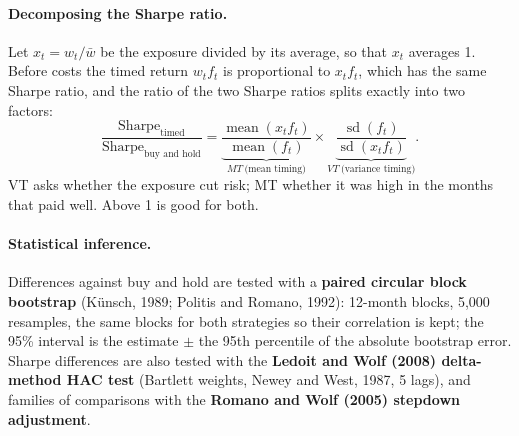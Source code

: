 \documentclass[12pt]{article}
\begin{document}
\paragraph{Decomposing the Sharpe ratio.} Let $x_t=w_t/\bar w$ be the exposure divided by its average, so that $x_t$ averages 1. Before costs the timed return $w_tf_t$ is proportional to $x_tf_t$, which has the same Sharpe ratio, and the ratio of the two Sharpe ratios splits exactly into two factors:
\begin{equation}\label{eq:mtvt}
\frac{\text{Sharpe}_{\text{timed}}}{\text{Sharpe}_{\text{buy and hold}}}=\underbrace{\frac{\operatorname{mean}(x_tf_t)}{\operatorname{mean}(f_t)}}_{MT\ \text{(mean timing)}}\times\underbrace{\frac{\operatorname{sd}(f_t)}{\operatorname{sd}(x_tf_t)}}_{VT\ \text{(variance timing)}}.
\end{equation}
VT asks whether the exposure cut risk; MT whether it was high in the months that paid well. Above 1 is good for both.

\paragraph{Statistical inference.} Differences against buy and hold are tested with a \textbf{paired circular block bootstrap} (Künsch, 1989; Politis and Romano, 1992): 12-month blocks, 5,000 resamples, the same blocks for both strategies so their correlation is kept; the 95\% interval is the estimate $\pm$ the 95th percentile of the absolute bootstrap error. Sharpe differences are also tested with the \textbf{Ledoit and Wolf (2008) delta-method HAC test} (Bartlett weights, Newey and West, 1987, 5 lags), and families of comparisons with the \textbf{Romano and Wolf (2005) stepdown adjustment}.





\startappendices

\end{document}
